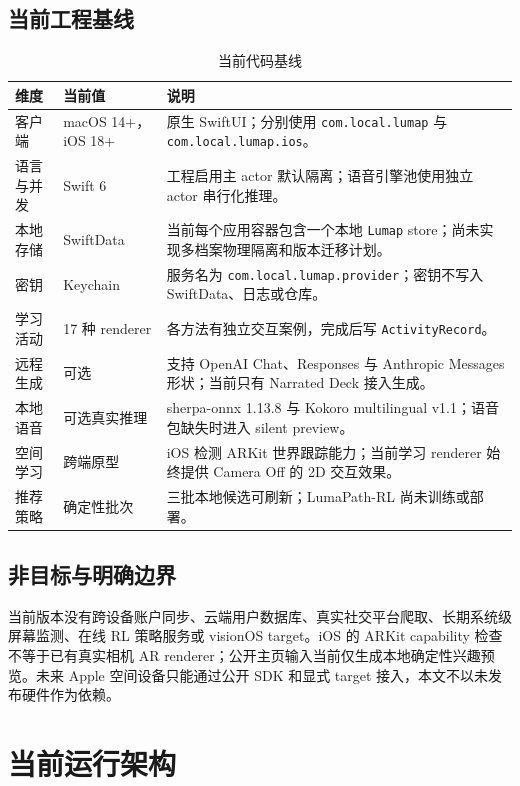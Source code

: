 \documentclass[11pt,a4paper,fontset=none]{ctexart}
\newcommand{\code}[1]{\begingroup\urlstyle{tt}\nolinkurl{#1}\endgroup}
\begin{document}
\subsection{当前工程基线}
\begin{table}[htbp]
\centering
\small
\caption{当前代码基线}
\begin{tabularx}{\textwidth}{P{27mm}P{37mm}Y}
\toprule
维度 & 当前值 & 说明 \\
\midrule
客户端 & macOS 14+，iOS 18+ & 原生 SwiftUI；分别使用 \code{com.local.lumap} 与 \code{com.local.lumap.ios}。 \\
语言与并发 & Swift 6 & 工程启用主 actor 默认隔离；语音引擎池使用独立 actor 串行化推理。 \\
本地存储 & SwiftData & 当前每个应用容器包含一个本地 \code{Lumap} store；尚未实现多档案物理隔离和版本迁移计划。 \\
密钥 & Keychain & 服务名为 \code{com.local.lumap.provider}；密钥不写入 SwiftData、日志或仓库。 \\
学习活动 & 17 种 renderer & 各方法有独立交互案例，完成后写 \code{ActivityRecord}。 \\
远程生成 & 可选 & 支持 OpenAI Chat、Responses 与 Anthropic Messages 形状；当前只有 Narrated Deck 接入生成。 \\
本地语音 & 可选真实推理 & sherpa-onnx 1.13.8 与 Kokoro multilingual v1.1；语音包缺失时进入 silent preview。 \\
空间学习 & 跨端原型 & iOS 检测 ARKit 世界跟踪能力；当前学习 renderer 始终提供 Camera Off 的 2D 交互效果。 \\
推荐策略 & 确定性批次 & 三批本地候选可刷新；LumaPath-RL 尚未训练或部署。 \\
\bottomrule
\end{tabularx}
\end{table}

\subsection{非目标与明确边界}
当前版本没有跨设备账户同步、云端用户数据库、真实社交平台爬取、长期系统级屏幕监测、在线 RL 策略服务或 visionOS target。iOS 的 ARKit capability 检查不等于已有真实相机 AR renderer；公开主页输入当前仅生成本地确定性兴趣预览。未来 Apple 空间设备只能通过公开 SDK 和显式 target 接入，本文不以未发布硬件作为依赖。

\section{当前运行架构}
\end{document}
